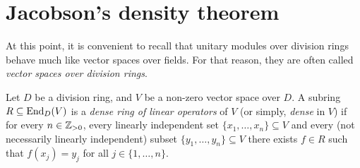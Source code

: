 %
%


\section{Jacobson's density theorem}
\label{section:density}
\lecture 

At this point, it is convenient to recall that unitary 
modules over division rings behave much like vector spaces over fields. For that reason, 
they are often called \emph{vector spaces over division rings}. 

\begin{definition}
	Let $D$ be a division ring, and $V$ be a non-zero vector space over $D$. A subring 
	$R\subseteq\operatorname{End}_D(V)$ is a \emph{dense ring of linear operators} 
	of $V$ (or simply, \emph{dense} in $V$) if for every  
	$n\in\mathbb{Z}_{>0}$, every linearly independent set $\{x_1,\dots,x_n\}\subseteq V$ 
	and every (not necessarily linearly independent) subset $\{y_1,\dots,y_n\}\subseteq V$ 
	there exists $f\in R$ such that $f(x_j)=y_j$ for all 
	$j\in\{1,\dots,n\}$.
\end{definition}

